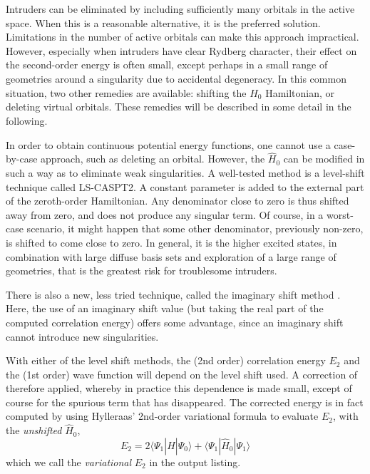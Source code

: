 Intruders can be eliminated by including sufficiently many orbitals in
the active space. When this is a reasonable alternative, it is the preferred
solution. Limitations in the number of active orbitals
can make this approach impractical. However, especially when intruders
have clear Rydberg character, their effect on the second-order energy is
often small, except perhaps in a small range of geometries around a singularity
due to accidental degeneracy. In this common situation, two other remedies
are available: shifting the $\hat{H}_0$ Hamiltonian, or deleting virtual
orbitals. These remedies will be described in some detail in the following.


In order to obtain continuous potential energy functions, one cannot use a
case-by-case approach, such as deleting an orbital. However, the $\hat{H}_0$
can be modified in such a way as to eliminate weak singularities.
A well-tested method is a level-shift technique called 
LS-CASPT2\cite{Roos:96b,Roos:95b}.
A constant parameter is added to the external part of the zeroth-order
Hamiltonian. Any denominator close to zero is thus shifted away from zero, and
does not produce any singular term. Of course, in a worst-case scenario, it
might happen that some other denominator, previously non-zero, is shifted to
come close to zero. In general,
it is the higher excited states, in combination with large diffuse basis sets
and exploration of a large range of geometries, that is the greatest risk for
troublesome intruders. 

There is also a new, less tried technique, called the imaginary shift
method \cite{Forsberg:96}. Here, the use of an imaginary shift value (but
taking the real part of the computed correlation energy) offers some
advantage, since an imaginary shift cannot introduce new singularities.

With either of the level shift methods, the (2nd order) correlation energy $E_2$
and the (1st order) wave function will depend on
the level shift used. A correction of therefore applied, whereby in practice
this dependence is made small, except of course for the spurious term that has
disappeared. The corrected energy is in fact computed by using Hylleraas' 2nd-order
variational formula to evaluate $E_2$, with the {\em unshifted} $\hat{H}_0$,
\begin{equation}
E_2 = 2 \langle\Psi_1 | \hat{H} |\Psi_0\rangle +\langle\Psi_1 | \hat{H}_0 |\Psi_1\rangle
\end{equation}
which we call the {\em variational} $E_2$ in the output listing.


